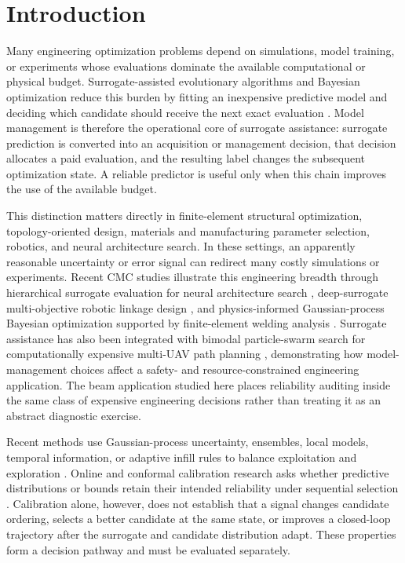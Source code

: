 \documentclass[cmc,article,submit,moreauthors,pdftex]{Definitions/tsp}
\begin{document}
\hypertarget{introduction}{%
\section{Introduction}\label{introduction}}

Many engineering optimization problems depend on simulations, model training, or experiments whose evaluations dominate the available computational or physical budget. Surrogate-assisted evolutionary algorithms and Bayesian optimization reduce this burden by fitting an inexpensive predictive model and deciding which candidate should receive the next exact evaluation \cite{ref-1,ref-2,ref-3,ref-4,ref-5}. Model management is therefore the operational core of surrogate assistance: surrogate prediction is converted into an acquisition or management decision, that decision allocates a paid evaluation, and the resulting label changes the subsequent optimization state. A reliable predictor is useful only when this chain improves the use of the available budget.

This distinction matters directly in finite-element structural optimization, topology-oriented design, materials and manufacturing parameter selection, robotics, and neural architecture search. In these settings, an apparently reasonable uncertainty or error signal can redirect many costly simulations or experiments. Recent CMC studies illustrate this engineering breadth through hierarchical surrogate evaluation for neural architecture search \cite{ref-27}, deep-surrogate multi-objective robotic linkage design \cite{ref-28}, and physics-informed Gaussian-process Bayesian optimization supported by finite-element welding analysis \cite{ref-29}. Surrogate assistance has also been integrated with bimodal particle-swarm search for computationally expensive multi-UAV path planning \cite{ref-33}, demonstrating how model-management choices affect a safety- and resource-constrained engineering application. The beam application studied here places reliability auditing inside the same class of expensive engineering decisions rather than treating it as an abstract diagnostic exercise.

Recent methods use Gaussian-process uncertainty, ensembles, local models, temporal information, or adaptive infill rules to balance exploitation and exploration \cite{ref-6,ref-7,ref-8,ref-9,ref-10,ref-11}. Online and conformal calibration research asks whether predictive distributions or bounds retain their intended reliability under sequential selection \cite{ref-12,ref-13,ref-14,ref-15}. Calibration alone, however, does not establish that a signal changes candidate ordering, selects a better candidate at the same state, or improves a closed-loop trajectory after the surrogate and candidate distribution adapt. These properties form a decision pathway and must be evaluated separately.
\end{document}
